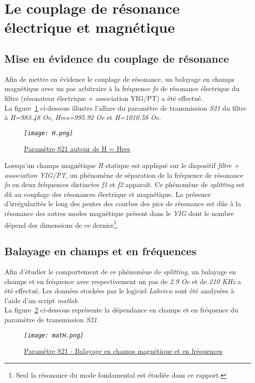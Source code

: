 \documentclass[12pt,fleqn]{book} %
\begin{document}
\section{Le couplage de résonance électrique et magnétique}
\subsection{Mise en évidence du couplage de résonance}
\noindent Afin de mettre en évidence le couplage de résonance, un balayage en champs magnétique avec un pas arbitraire à la fréquence \emph{fo} de résonance électrique du filtre (résonateur électrique + association YIG/PT) a été effectué.
~\\La figure~\underline{\color{blue}\ref{Hres}} ci-dessous illustre l'allure du paramètre de transmission \emph{S21} du filtre à \emph{H=983.48 Oe}, \emph{Hres=995.92 Oe} et \emph{H=1010.58 Oe}.
\begin{figure}[H]
	\centering
	\itshape
	\texttt{[image: H.png]}
	\caption{\label{Hres} \underline{Paramètre S21 autour de H = Hres}}
\end{figure}
\noindent Lorsqu'un champs magnétique \emph{H} statique est appliqué sur le dispositif \emph{filtre + association YIG/PT}, un phénomène de séparation de la fréquence de résonance \emph{fo} en deux fréquences distinctes \emph{f1} et \emph{f2} apparaît. Ce phénomène de \emph{splitting} est dû au couplage des résonances électrique et magnétique.
La présence d'irrégularités le long des pentes des courbes des pics de résonance est dûe à la résonance des autres modes magnétique présent dans le \emph{YIG} dont le nombre dépend des dimensions de ce dernier\footnote{Seul la résonance du mode fondamental est étudiée dans ce rapport.}. 
\subsection{Balayage en champs et en fréquences}
\noindent Afin d'étudier le comportement de ce phénomène de \emph{splitting}, un balayage en champs et en fréquence avec respectivement un pas de \emph{2.9 Oe} et de \emph{210 KHz} a été effectué. Les données stockées par le logiciel \emph{Labview} sont été analysées à l'aide d'un script \emph{matlab}.
~\\La figure~\underline{\color{blue}\ref{matH}} ci-dessous représente la dépendance en champs et en fréquence du paramètre de transmission \emph{S21}.
\begin{figure}[H]
	\centering
	\itshape
	\texttt{[image: matH.png]}
	\caption{\label{matH} \underline{Paramètre S21 - Balayage en champs magnétique et en fréquences}}
\end{figure}
\end{document}
